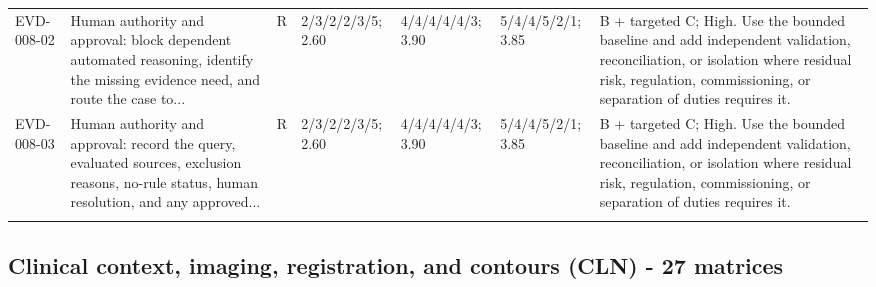 \documentclass[11pt,letterpaper]{article}
\begin{document}
\begin{scriptsize}
\begin{longtable}{@{}L{0.11\textwidth}L{0.165\textwidth}L{0.04\textwidth}L{0.115\textwidth}L{0.115\textwidth}L{0.115\textwidth}L{0.235\textwidth}@{}}
\addlinespace[2pt]
EVD-008-02 & Human authority and approval: block dependent automated reasoning, identify the missing evidence need, and route the case to... & R & 2/3/2/2/3/5; 2.60 & 4/4/4/4/4/3; 3.90 & 5/4/4/5/2/1; 3.85 & B + targeted C; High. Use the bounded baseline and add independent validation, reconciliation, or isolation where residual risk, regulation, commissioning, or separation of duties requires it. \\
\addlinespace[2pt]
EVD-008-03 & Human authority and approval: record the query, evaluated sources, exclusion reasons, no-rule status, human resolution, and any approved... & R & 2/3/2/2/3/5; 2.60 & 4/4/4/4/4/3; 3.90 & 5/4/4/5/2/1; 3.85 & B + targeted C; High. Use the bounded baseline and add independent validation, reconciliation, or isolation where residual risk, regulation, commissioning, or separation of duties requires it. \\
\addlinespace[2pt]
\end{longtable}
\end{scriptsize}

\subsection{Clinical context, imaging, registration, and contours (CLN) - 27 matrices}
\end{document}
